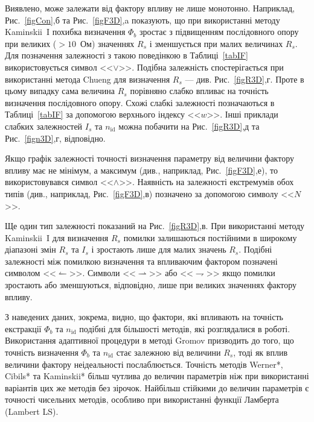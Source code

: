 Виявлено, може залежати від фактору впливу не лише монотонно.
Наприклад, Рис.~\ref{figCon},б та Рис.~\ref{figF3D},a показують, що при використанні методу Kaminskii~I похибка визначення $\Phi_b$ зростає з підвищенням послідовного опору при великих ($>10$~Ом) значеннях $R_s$ і зменшується при малих величинах $R_s$.
Для позначення залежності з такою поведінкою в Таблиці~\ref{tabIF} використовується символ <<$\vee$>>.
Подібна залежність спостерігається при використанні метода Chueng для визначення $R_s$ --- див. Рис.~\ref{figR3D},г.
Проте в цьому випадку сама величина $R_s$ порівняно слабко впливає на точність визначення послідовного опору.
Схожі слабкі залежності позначаються в Таблиці~\ref{tabIF} за допомогою верхнього індексу  <<$w$>>.
Інші приклади слабких залежностей $I_s$ та  $n_\mathrm{id}$ можна побачити на Рис.~\ref{figR3D},д та Рис.~\ref{fign3D},г, відповідно.

Якщо графік залежності точності визначення параметру від величини фактору впливу має не мінімум, а максимум (див., наприклад, Рис.~\ref{figF3D},е),
то використовувався символ <<$\wedge$>>.
Наявність на залежності екстремумів обох типів (див., наприклад, Рис.~\ref{figF3D},в) позначено за допомогою символу <<$N$>>.

Ще один тип залежності показаний на Рис.~\ref{figR3D},в.
При використанні методу Kaminskii~I для визначення  $R_s$ помилки залишаються постійними в широкому діапазоні змін $R_s$ та $I_s$ і зростають лише для малих значень $R_s$.
Подібні залежності між помилкою визначення та впливаючим фактором позначені символом <<$\leftharpoonup$>>.
Символи <<$\rightharpoonup$>> або <<$\rightharpoondown$>> якщо помилки зростають або зменшуються, відповідно, лише при великих значеннях фактору впливу.

З наведених даних, зокрема, видно, що фактори, які впливають на точність екстракції $\Phi_b$ та  $n_\mathrm{id}$ подібні для більшості методів, які розглядалися в роботі.
Використання адаптивної процедури в методі Gromov призводить до того, що точність визначення $\Phi_b$ та  $n_\mathrm{id}$ стає залежною від величини $R_s$, тоді як вплив величини фактору неідеальності послаблюється.
Точність методів Werner*, Cibils* та Kaminskii* більш чутлива до величин параметрів ніж при використанні варіантів цих же методів без зірочок.
Найбільш стійкими до величин параметрів є точності чисельних методів, особливо при використанні функції Ламберта (Lambert LS).


